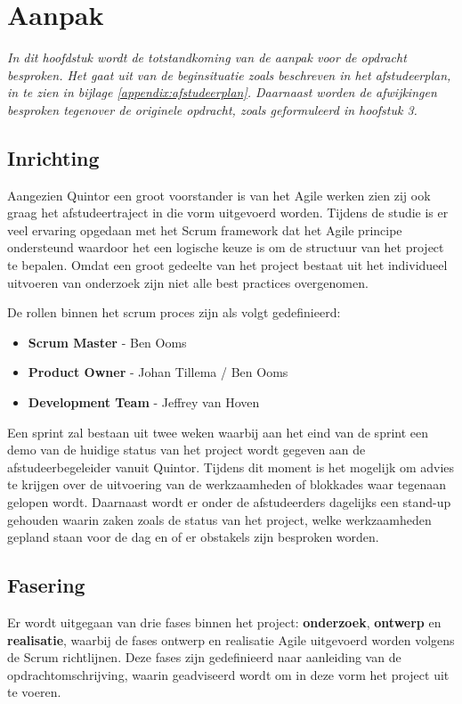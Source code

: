 \chapter{Aanpak}
\label{Aanpak}

\textit{In dit hoofdstuk wordt de totstandkoming van de aanpak voor de opdracht besproken. Het gaat uit van de beginsituatie zoals beschreven in het afstudeerplan, in te zien in bijlage \ref{appendix:afstudeerplan}. Daarnaast worden de afwijkingen besproken tegenover de originele opdracht, zoals geformuleerd in hoofstuk 3.}

\section{Inrichting}

Aangezien Quintor een groot voorstander is van het Agile werken zien zij ook graag het afstudeertraject in die vorm uitgevoerd worden. Tijdens de studie is er veel ervaring opgedaan met het Scrum framework dat het Agile principe ondersteund waardoor het een logische keuze is om de structuur van het project te bepalen. Omdat een groot gedeelte van het project bestaat uit het individueel uitvoeren van onderzoek zijn niet alle best practices overgenomen. 

De rollen binnen het scrum proces \citep{schwaber2011scrum} zijn als volgt gedefinieerd:
\begin{itemize}[noitemsep]
  \item \textbf{Scrum Master} - Ben Ooms
  \item \textbf{Product Owner} - Johan Tillema / Ben Ooms
  \item \textbf{Development Team} - Jeffrey van Hoven
\end{itemize}

Een sprint zal bestaan uit twee weken waarbij aan het eind van de sprint een demo van de huidige status van het project wordt gegeven aan de afstudeerbegeleider vanuit Quintor. Tijdens dit moment is het mogelijk om advies te krijgen over de uitvoering van de werkzaamheden of blokkades waar tegenaan gelopen wordt. Daarnaast wordt er onder de afstudeerders dagelijks een stand-up gehouden waarin zaken zoals de status van het project, welke werkzaamheden gepland staan voor de dag en of er obstakels zijn besproken worden.
\section{Fasering}

Er wordt uitgegaan van drie fases binnen het project: \textbf{onderzoek}, \textbf{ontwerp} en \textbf{realisatie}, waarbij de fases ontwerp en realisatie Agile uitgevoerd worden volgens de Scrum richtlijnen. Deze fases zijn gedefinieerd naar aanleiding van de opdrachtomschrijving, waarin geadviseerd wordt om in deze vorm het project uit te voeren.

